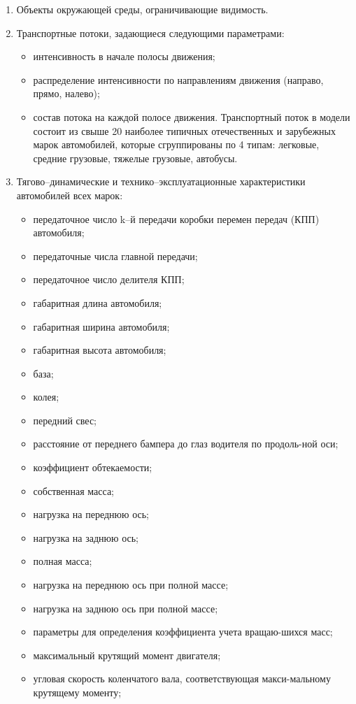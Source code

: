 \documentclass[a4paper,14pt]{article}
\begin{document}
\begin{enumerate}
\item Объекты окружающей среды, ограничивающие видимость.

\item Транспортные потоки, задающиеся следующими параметрами:
\begin{itemize}
\item интенсивность в начале полосы движения;
\item распределение интенсивности по направлениям движения (направо, прямо, налево);
\item состав потока на каждой полосе движения. Транспортный поток в модели состоит из свыше 20 наиболее типичных отечественных и зарубежных марок автомобилей, которые сгруппированы по 4 типам: легковые, средние грузовые, тяжелые грузовые, автобусы.
\end{itemize}
\item Тягово–динамические и технико–эксплуатационные характеристики автомобилей всех марок:
\begin{itemize}
\item передаточное число  k–й передачи коробки перемен передач (КПП) автомобиля;
\item передаточные числа главной передачи;
\item передаточное число делителя КПП;
\item габаритная длина автомобиля;
\item габаритная ширина автомобиля;
\item габаритная высота автомобиля;
\item база;
\item колея;
\item передний свес;
\item расстояние от переднего бампера до глаз водителя по продоль-ной оси;
\item коэффициент обтекаемости;
\item собственная масса;
\item нагрузка на переднюю ось;
\item нагрузка на заднюю ось;
\item полная масса;
\item нагрузка на переднюю ось при полной массе;
\item нагрузка на заднюю ось при полной массе;
\item параметры для определения коэффициента учета вращаю-шихся масс;
\item максимальный крутящий момент двигателя;
\item угловая скорость коленчатого вала, соответствующая макси-мальному крутящему моменту;

\end{itemize}
\end{enumerate}
\end{document}
